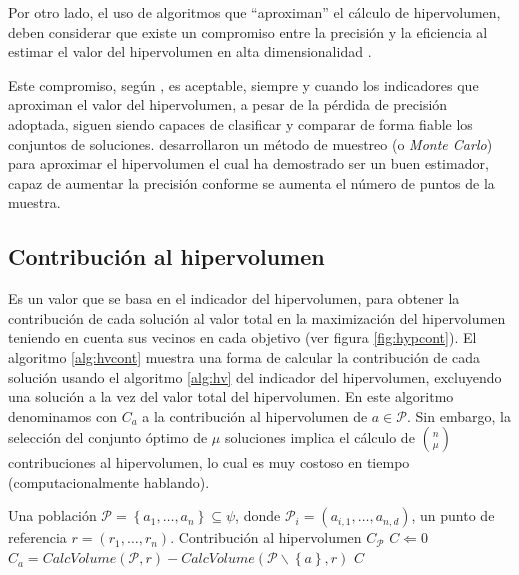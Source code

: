   Por otro lado, el uso de algoritmos que ``aproximan'' el c\'alculo de hipervolumen, deben considerar que existe un compromiso
  entre la precisi\'on y la eficiencia al estimar el valor del hipervolumen en alta dimensionalidad \cite{Braberman07, bdz2008a}.
 
  Este compromiso, seg\'un \cite{Bader11}, es aceptable, siempre y cuando los indicadores que aproximan el valor del hipervolumen, a 
  pesar de la p\'erdida de precisi\'on adoptada, siguen siendo capaces de  clasificar y comparar de forma fiable los conjuntos de soluciones. 
  \cite{Everson02fullelite} desarrollaron un  m\'etodo de muestreo (o \textit{Monte Carlo}) para aproximar el hipervolumen el cual ha 
  demostrado ser un buen estimador, capaz de aumentar la precisi\'on conforme se aumenta el n\'umero de puntos de la muestra. 
  
  \subsection{Contribuci\'on al hipervolumen}

  Es un valor que se basa en el indicador del hipervolumen, para obtener  
  la contribuci\'on de cada soluci\'on al valor total en la maximizaci\'on del hipervolumen teniendo en cuenta sus vecinos en cada 
  objetivo (ver figura \ref{fig:hypcont}). El algoritmo \ref{alg:hvcont} muestra una forma de calcular la contribuci\'on 
  de cada soluci\'on usando el algoritmo \ref{alg:hv} del indicador del hipervolumen, excluyendo una soluci\'on a la vez
  del valor total del hipervolumen. En este algoritmo denominamos con $C_a$ a la contribuci\'on al hipervolumen de $a \in \mathcal{P}$.
  Sin embargo, la selecci\'on del conjunto \'optimo de $\mu$ soluciones implica el c\'alculo de ${n \choose \mu}$ contribuciones al 
  hipervolumen, lo cual es muy costoso en tiempo (computacionalmente hablando).
    
   \begin{algorithm}
  \begin{algorithmic}[1]			
		\REQUIRE Una poblaci\'on $\mathcal{P}=\left\{a_1,\ldots,a_n\right\} \subseteq \psi$, 
		donde $\mathcal{P}_i = \left(a_{i,1},\ldots,a_{n,d}\right) $, un punto de referencia $r=\left(r_1,\ldots,r_n\right)$.		
		\ENSURE Contribuci\'on al hipervolumen $C_{\mathcal{P}}$
		\STATE $C\Leftarrow 0$
			\STATE $C_{a} = CalcVolume(\mathcal{P},r) - CalcVolume(\mathcal{P}\backslash \left\{a\right\},r)$
		\ENDWHILE
		\RETURN $C$
  \end{algorithmic}
  \caption{$estimandoContribucion\left(\mathcal{P}\right)$}
  \label{alg:hvcont}
  \end{algorithm}
  

